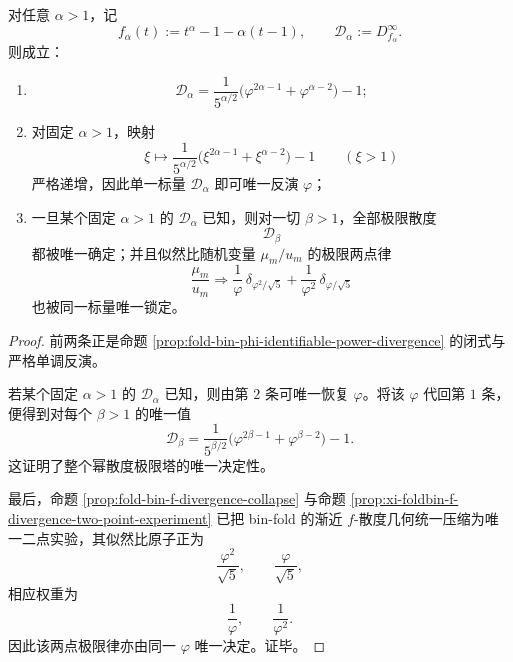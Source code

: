 \begin{theorem}[单一幂散度标量决定整个极限散度塔]\label{thm:xi-time-part75a-single-power-divergence-determines-limit-tower}
对任意 \(\alpha>1\)，记
\[
f_\alpha(t):=t^\alpha-1-\alpha(t-1),
\qquad
\mathcal D_\alpha:=D_{f_\alpha}^\infty.
\]
则成立：
\begin{enumerate}
  \item
  \[
  \mathcal D_\alpha
  =
  \frac{1}{5^{\alpha/2}}
  \bigl(\varphi^{2\alpha-1}+\varphi^{\alpha-2}\bigr)-1;
  \]
  \item 对固定 \(\alpha>1\)，映射
  \[
  \xi\longmapsto
  \frac{1}{5^{\alpha/2}}
  \bigl(\xi^{2\alpha-1}+\xi^{\alpha-2}\bigr)-1
  \qquad (\xi>1)
  \]
  严格递增，因此单一标量 \(\mathcal D_\alpha\) 即可唯一反演 \(\varphi\)；
  \item 一旦某个固定 \(\alpha>1\) 的 \(\mathcal D_\alpha\) 已知，则对一切 \(\beta>1\)，全部极限散度
  \[
  \mathcal D_\beta
  \]
  都被唯一确定；并且似然比随机变量 \(\mu_m/u_m\) 的极限两点律
  \[
  \frac{\mu_m}{u_m}
  \Longrightarrow
  \frac1\varphi\,\delta_{\varphi^2/\sqrt5}
  +
  \frac1{\varphi^2}\,\delta_{\varphi/\sqrt5}
  \]
  也被同一标量唯一锁定。
\end{enumerate}
\end{theorem}
\begin{proof}
前两条正是命题 \ref{prop:fold-bin-phi-identifiable-power-divergence} 的闭式与严格单调反演。

若某个固定 \(\alpha>1\) 的 \(\mathcal D_\alpha\) 已知，则由第 \(2\) 条可唯一恢复 \(\varphi\)。将该 \(\varphi\) 代回第 \(1\) 条，便得到对每个 \(\beta>1\) 的唯一值
\[
\mathcal D_\beta
=
\frac{1}{5^{\beta/2}}
\bigl(\varphi^{2\beta-1}+\varphi^{\beta-2}\bigr)-1.
\]
这证明了整个幂散度极限塔的唯一决定性。

最后，命题 \ref{prop:fold-bin-f-divergence-collapse} 与命题 \ref{prop:xi-foldbin-f-divergence-two-point-experiment} 已把 bin-fold 的渐近 \(f\)-散度几何统一压缩为唯一二点实验，其似然比原子正为
\[
\frac{\varphi^2}{\sqrt5},
\qquad
\frac{\varphi}{\sqrt5},
\]
相应权重为
\[
\frac1\varphi,
\qquad
\frac1{\varphi^2}.
\]
因此该两点极限律亦由同一 \(\varphi\) 唯一决定。证毕。
\end{proof}


